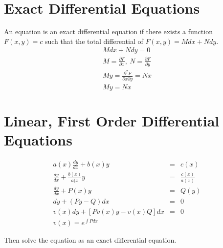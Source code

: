 \documentclass{article}
\begin{document}
\section{Exact Differential Equations}
An equation is an exact differential equation if there exists a function $F(x,y)=c$ such that the total differential of $F(x,y)=Mdx+Ndy$.
\begin{eqnarray}
Mdx + Ndy = 0 \\
M = \frac{\partial F}{\partial x}, \: N = \frac{\partial F}{\partial y} \\ 
My = \frac{\partial^2 F}{\partial x \partial y} = Nx \\
My = Nx
\end{eqnarray}

\section{Linear, First Order Differential Equations}
\begin{eqnarray}
a(x)\frac{dy}{dx} + b(x)y &=& c(x) \\
\frac{dy}{dx} + \frac{b(x)}{a(x}y &=& \frac{c(x)}{a(x)} \\
\frac{dy}{dx} + P(x)y &=& Q(y) \\
dy + (Py - Q)dx &=& 0\\
v(x)dy + [Pv(x)y - v(x)Q]dx &=& 0 \\
v(x) = e^{\int{Pdx}}
\end{eqnarray}

Then solve the equation as an exact differential equation.
\end{document}
